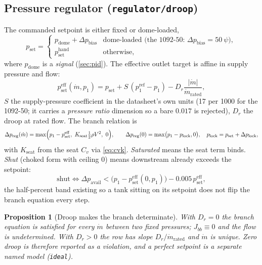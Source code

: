 \documentclass[11pt,a4paper]{article}
\newtheorem{proposition}{Proposition}
\newcommand{\mdot}{\dot{m}}
\newcommand{\code}[1]{\texttt{#1}}
\begin{document}
\subsection{Pressure regulator (\code{regulator/droop})}\label{sec:regulator}
The commanded setpoint is either fixed or dome-loaded,
\begin{equation}
  p_{\mathrm{set}} = \begin{cases} p_{\mathrm{dome}} + \Delta p_{\mathrm{bias}} & \text{dome-loaded (the 1092-50: } \Delta p_{\mathrm{bias}}=\SI{50}{\psi}),\\ p_{\mathrm{set}}^{\mathrm{hand}} & \text{otherwise,}\end{cases}
\end{equation}
where $p_{\mathrm{dome}}$ is a \emph{signal} (\cref{sec:pid}). The effective
outlet target is affine in supply pressure and flow:
\begin{equation}
  p^{\mathrm{eff}}_{\mathrm{set}}(\mdot,p_1)
   = p_{\mathrm{set}} + S\,(p_1^{\mathrm{ref}}-p_1) - D_r\frac{|\mdot|}{\mdot_{\mathrm{rated}}},
  \label{eq:reg}
\end{equation}
$S$ the supply-pressure coefficient in the datasheet's own units
(\SI{17}{\psi} per \SI{1000}{\psi} for the 1092-50; it carries a
\emph{pressure ratio} dimension so a bare $0.017$ is rejected), $D_r$ the droop
at rated flow. The branch relation is
\begin{equation}
  \Delta p_{\mathrm{reg}}(\mdot) = \max\Bigl(p_1-p^{\mathrm{eff}}_{\mathrm{set}},\ K_{\mathrm{seat}}\tfrac12\rho V^2,\ 0\Bigr),\qquad
  \Delta p_{\mathrm{reg}}(0)=\max\bigl(p_1-p_{\mathrm{lock}},0\bigr),\quad
  p_{\mathrm{lock}}=p_{\mathrm{set}}+\Delta p_{\mathrm{lock}},
\end{equation}
with $K_{\mathrm{seat}}$ from the seat $C_v$ via \cref{eq:cvk}. \emph{Saturated}
means the seat term binds. \emph{Shut} (choked form with ceiling $0$) means
downstream already exceeds the setpoint:
\begin{equation}
  \text{shut}\iff \Delta p_{\mathrm{avail}} < \bigl(p_1 - p^{\mathrm{eff}}_{\mathrm{set}}(0,p_1)\bigr) - 0.005\,p^{\mathrm{eff}}_{\mathrm{set}},
\end{equation}
the half-percent band existing so a tank sitting on its setpoint does not flip
the branch equation every step.

\begin{proposition}[Droop makes the branch determinate]
With $D_r=0$ the branch equation is satisfied for every $\mdot$ between two
fixed pressures; $J_{bb}\equiv0$ and the flow is undetermined. With $D_r>0$ the
row has slope $D_r/\mdot_{\mathrm{rated}}$ and $\mdot$ is unique. Zero droop
is therefore reported as a violation, and a perfect setpoint is a separate
named model (\code{ideal}).
\end{proposition}
\end{document}
